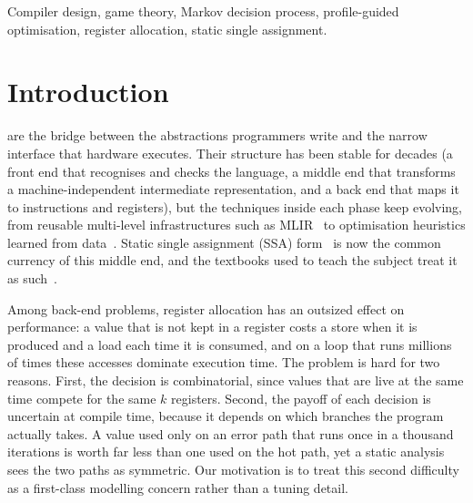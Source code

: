\documentclass{ieeeaccess}
\begin{document}
\begin{keywords}
Compiler design, game theory, Markov decision process,
profile-guided optimisation, register allocation, static single
assignment.
\end{keywords}

\titlepgskip=-15pt

\maketitle

\section{Introduction}
\label{sec:intro}

 are the bridge between the abstractions programmers write and
the narrow interface that hardware executes. Their structure has been
stable for decades (a front end that recognises and checks the
language, a middle end that transforms a machine-independent
intermediate representation, and a back end that maps it to
instructions and registers), but the techniques inside each phase keep
evolving, from reusable multi-level infrastructures such as
MLIR~\cite{lattner2021mlir} to optimisation heuristics learned from
data~\cite{wang2018ml,ashouri2018survey,leather2020ml}. Static single
assignment (SSA) form~\cite{cytron1991ssa,rastello2022ssa} is now the
common currency of this middle end, and the textbooks used to teach the
subject treat it as such~\cite{cooper2022eac,aho2006dragon}.

Among back-end problems, register allocation has an outsized effect on
performance: a value that is not kept in a register costs a store when
it is produced and a load each time it is consumed, and on a loop that
runs millions of times these accesses dominate execution time. The
problem is hard for two reasons. First, the decision is combinatorial,
since values that are live at the same time compete for the same $k$
registers. Second, the payoff of each decision is uncertain at compile
time, because it depends on which branches the program actually takes.
A value used only on an error path that runs once in a thousand
iterations is worth far less than one used on the hot path, yet a
static analysis sees the two paths as symmetric. Our motivation is to
treat this second difficulty as a first-class modelling concern rather
than a tuning detail.
\end{document}
